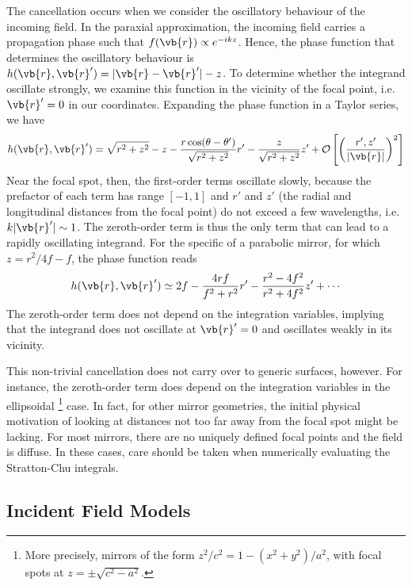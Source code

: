 \documentclass[11pt,SymmetricalJury]{inrsthesis/inrsthesis}
\begin{document}
The cancellation occurs when we consider the oscillatory behaviour of the
incoming field. In the paraxial approximation, the incoming field carries
a propagation phase such that $f(\vb{r})\propto e^{-ikz}$. Hence, the phase
function that determines the oscillatory behaviour is
$h(\vb{r},\vb{r}')=|\vb{r}-\vb{r}'|-z$. To determine whether the integrand
oscillate strongly, we examine this function in the vicinity of the focal
point, i.e. $\vb{r}'=0$ in our coordinates.
Expanding the phase function in a Taylor series, we have
  \begin{equation}
    h(\vb{r},\vb{r}') = \sqrt{r^2+z^2}-z
                  -\frac{r\cos(\theta-\theta')}{\sqrt{r^2+z^2}} r'
                  -\frac{z}{\sqrt{r^2+z^2}}z'
                  + \mathcal{O}\left[\left(\frac{r',z'}{|\vb{r}|}\right)^2\right]
  \end{equation}
Near the focal spot, then, the first-order terms oscillate slowly, because the prefactor
of each term has range $[-1,1]$ and $r'$ and $z'$
(the radial and longitudinal distances from the focal point)
do not exceed a few wavelengths, i.e. $k|\vb{r}'|\sim1$.
The zeroth-order term
is thus the only term that can lead to a rapidly oscillating
integrand.
For the specific of a parabolic mirror, for which $z=r^2/4f-f$, the phase function
reads
  \begin{equation}
    h(\vb{r},\vb{r}')\simeq 2f - \frac{4rf}{f^2+r^2} r' - \frac{r^2-4f^2}{r^2+4f^2} z' + \cdots
    \label{eq:sc.parabola-phase-taylor}
  \end{equation}
The zeroth-order term does not depend on the integration variables, implying
that the integrand does not oscillate at $\vb{r}'=0$ and oscillates weakly
in its vicinity.

This non-trivial cancellation does not carry over to generic surfaces, however.
For instance, the zeroth-order term does depend on the integration variables
in the ellipsoidal \footnote{More precisely,
mirrors of the form $z^2/c^2=1-(x^2+y^2)/a^2$, with focal spots
at $z=\pm\sqrt{c^2-a^2}$.} case. In fact, for other mirror geometries, the initial
physical motivation of looking at distances not too far away from the focal spot
might be lacking. For most mirrors, there are no uniquely
defined focal points and the field is diffuse. In these cases, care
should be taken when numerically evaluating the Stratton-Chu integrals.

\subsection{Incident Field Models}
\end{document}
